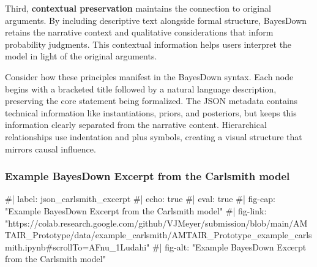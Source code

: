\documentclass[
  11pt,
  letterpaper,
]{book}
\newenvironment{Shaded}{\begin{snugshade}}{\end{snugshade}}
\newcommand{\ErrorTok}[1]{\textcolor[rgb]{0.68,0.00,0.00}{#1}}
\begin{document}
\begin{landscape}
Third, \textbf{contextual preservation} maintains the connection to
original arguments. By including descriptive text alongside formal
structure, BayesDown retains the narrative context and qualitative
considerations that inform probability judgments. This contextual
information helps users interpret the model in light of the original
arguments.

Consider how these principles manifest in the BayesDown syntax. Each
node begins with a bracketed title followed by a natural language
description, preserving the core statement being formalized. The JSON
metadata contains technical information like instantiations, priors, and
posteriors, but keeps this information clearly separated from the
narrative content. Hierarchical relationships use indentation and plus
symbols, creating a visual structure that mirrors causal influence.

\subsubsection*{Example BayesDown Excerpt from the Carlsmith
model}\label{example-bayesdown-excerpt-from-the-carlsmith-model}

\begin{Shaded}
\begin{Highlighting}[]
\ErrorTok{\#|} \ErrorTok{label:} \ErrorTok{json\_carlsmith\_excerpt}
\ErrorTok{\#|} \ErrorTok{echo:} \ErrorTok{true}
\ErrorTok{\#|} \ErrorTok{eval:} \ErrorTok{true}
\ErrorTok{\#|} \ErrorTok{fig{-}cap:} \ErrorTok{"Example} \ErrorTok{BayesDown} \ErrorTok{Excerpt} \ErrorTok{from} \ErrorTok{the} \ErrorTok{Carlsmith} \ErrorTok{model"}
\ErrorTok{\#|} \ErrorTok{fig{-}link:} \ErrorTok{"https://colab.research.google.com/github/VJMeyer/submission/blob/main/AMTAIR\_Prototype/data/example\_carlsmith/AMTAIR\_Prototype\_example\_carlsmith.ipynb\#scrollTo=AFnu\_1Ludahi"}
\ErrorTok{\#|} \ErrorTok{fig{-}alt:} \ErrorTok{"Example} \ErrorTok{BayesDown} \ErrorTok{Excerpt} \ErrorTok{from} \ErrorTok{the} \ErrorTok{Carlsmith} \ErrorTok{model"}




\end{Highlighting}
\end{Shaded}
\end{landscape}
\end{document}
